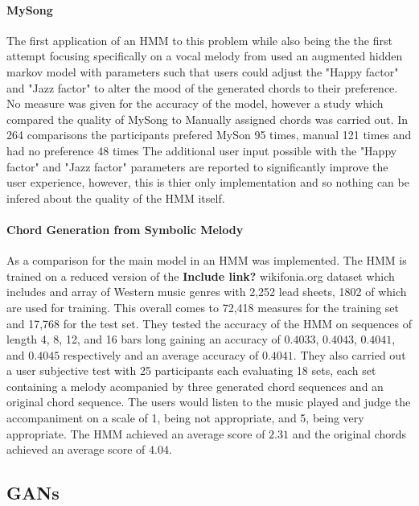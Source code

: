 \paragraph{MySong} The first application of an HMM to this problem while also being the the first attempt focusing specifically on a vocal melody from \cite{MySong} used an augmented hidden markov model with parameters such that users could adjust the "Happy factor" and "Jazz factor" to alter the mood of the generated chords to their preference.
No measure was given for the accuracy of the model, however a study which compared the quality of MySong to Manually assigned chords was carried out. 
In 264 comparisons the participants prefered MySon 95 times, manual 121 times and had no preference 48 times
The additional user input possible with the "Happy factor" and "Jazz factor" parameters are reported to significantly improve the user experience, however, this is thier only implementation and so nothing can be infered about the quality of the HMM itself.

\paragraph{Chord Generation from Symbolic Melody} \label{para:ChordGenfromSymMelody} As a comparison for the main model in \cite{BLSTM} an HMM was implemented. 
The HMM is trained on a reduced version of the \textbf{Include link?} wikifonia.org dataset which includes and array of Western music genres with 2,252 lead sheets, 1802 of which are used for training. 
This overall comes to 72,418 measures for the training set and 17,768 for the test set. 
They tested the accuracy of the HMM on sequences of length 4, 8, 12, and 16 bars long gaining an accuracy of $0.4033$, $0.4043$, $0.4041$, and $0.4045$ respectively and an average accuracy of $0.4041$.
They also carried out a user subjective test with 25 participants each evaluating 18 sets, each set containing a melody acompanied by three generated chord sequences and an original chord sequence.
The users would listen to the music played and judge the accompaniment on a scale of 1, being not appropriate, and 5, being very appropriate.
The HMM achieved an average score of $2.31$ and the original chords achieved an average score of $4.04$.


\subsection{GANs}

